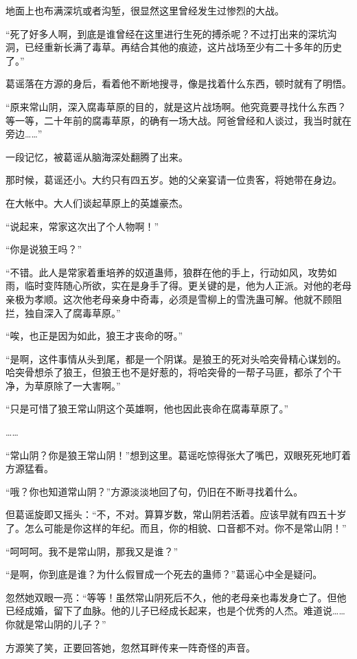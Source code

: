 \begin{this_body}
地面上也布满深坑或者沟堑，很显然这里曾经发生过惨烈的大战。

“死了好多人啊，到底是谁曾经在这里进行生死的搏杀呢？不过打出来的深坑沟洞，已经重新长满了毒草。再结合其他的痕迹，这片战场至少有二十多年的历史了。”

葛谣落在方源的身后，看着他不断地搜寻，像是找着什么东西，顿时就有了明悟。

“原来常山阴，深入腐毒草原的目的，就是这片战场啊。他究竟要寻找什么东西？等一等，二十年前的腐毒草原，的确有一场大战。阿爸曾经和人谈过，我当时就在旁边……”

一段记忆，被葛谣从脑海深处翻腾了出来。

那时候，葛谣还小。大约只有四五岁。她的父亲宴请一位贵客，将她带在身边。

在大帐中。大人们谈起草原上的英雄豪杰。

“说起来，常家这次出了个人物啊！”

“你是说狼王吗？”

“不错。此人是常家着重培养的奴道蛊师，狼群在他的手上，行动如风，攻势如雨，临时变阵随心所欲，实在是身手了得。更关键的是，他为人正派。对他的老母亲极为孝顺。这次他老母亲身中奇毒，必须是雪柳上的雪洗蛊可解。他就不顾阻拦，独自深入了腐毒草原。”

“唉，也正是因为如此，狼王才丧命的呀。”

“是啊，这件事情从头到尾，都是一个阴谋。是狼王的死对头哈突骨精心谋划的。哈突骨想杀了狼王，但狼王也不是好惹的，将哈突骨的一帮子马匪，都杀了个干净，为草原除了一大害啊。”

“只是可惜了狼王常山阴这个英雄啊，他也因此丧命在腐毒草原了。”

……

“常山阴？你是狼王常山阴！”想到这里。葛谣吃惊得张大了嘴巴，双眼死死地盯着方源猛看。

“哦？你也知道常山阴？”方源淡淡地回了句，仍旧在不断寻找着什么。

但葛谣旋即又摇头：“不，不对。算算岁数，常山阴若活着。应该早就有四五十岁了。怎么可能是你这样的年纪。而且，你的相貌、口音都不对。你不是常山阴！”

“呵呵呵。我不是常山阴，那我又是谁？”

“是啊，你到底是谁？为什么假冒成一个死去的蛊师？”葛谣心中全是疑问。

忽然她双眼一亮：“等等！虽然常山阴死后不久，他的老母亲也毒发身亡了。但他已经成婚，留下了血脉。他的儿子已经成长起来，也是个优秀的人杰。难道说……你就是常山阴的儿子？”

方源笑了笑，正要回答她，忽然耳畔传来一阵奇怪的声音。


\end{this_body}
